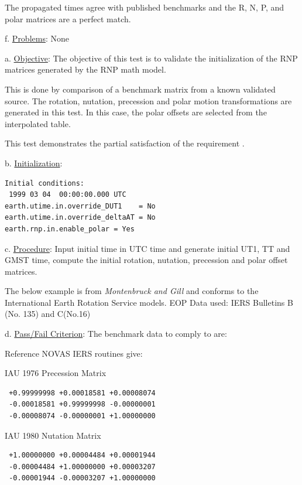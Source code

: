 The propagated times agree with published benchmarks and the R, N, P, and 
polar matrices are a perfect match.\newline

f. \underline{Problems}:\newline
None


\label{test:rnp_test3}

a. \underline{Objective}:\newline
The objective of this test is to validate the initialization of the 
RNP matrices generated by the RNP math model.  

This is done by comparison of a benchmark matrix from a known validated 
source.  The rotation, nutation, precession and polar motion transformations 
are generated in this test. In this case, the polar offsets are selected
from the interpolated table.

This test demonstrates the partial satisfaction
of the requirement .

b. \underline{Initialization}:
\begin{verbatim}
Initial conditions:
 1999 03 04  00:00:00.000 UTC
earth.utime.in.override_DUT1    = No
earth.utime.in.override_deltaAT = No
earth.rnp.in.enable_polar = Yes
\end{verbatim}

c. \underline{Procedure}:\newline
Input initial time in UTC time and generate initial UT1, TT and GMST time, 
compute the initial rotation, nutation, precession 
and polar offset matrices.

The below example is from {\em Montenbruck and Gill} \cite{MG} 
and conforms to the International Earth Rotation Service models.  
EOP Data used: IERS Bulletins B (No. 135) and C(No.16)\newline

d. \underline{Pass/Fail Criterion}:\newline
The benchmark data to comply to are:

Reference NOVAS \cite{NOVAS} IERS routines give:

IAU 1976 Precession Matrix
\begin{verbatim}
 +0.99999998 +0.00018581 +0.00008074
 -0.00018581 +0.99999998 -0.00000001
 -0.00008074 -0.00000001 +1.00000000
\end{verbatim}

IAU 1980 Nutation Matrix
\begin{verbatim}
 +1.00000000 +0.00004484 +0.00001944
 -0.00004484 +1.00000000 +0.00003207
 -0.00001944 -0.00003207 +1.00000000
\end{verbatim}

